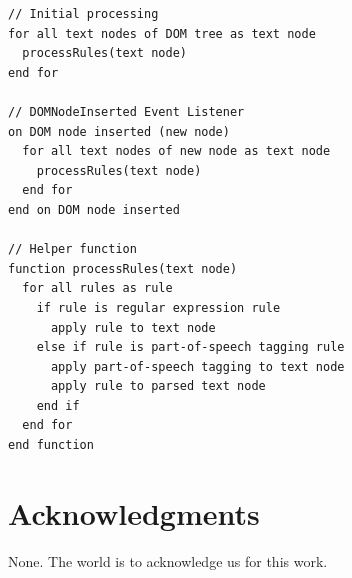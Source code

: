 \documentclass{acm_proc_article-sp}
\newcommand{\inlinelistingsize}{\fontsize{8pt}{11pt}}
\let\oldttdefault\ttdefault
\renewcommand{\ttdefault}{pcr}
\let\oldurl\url
\renewcommand{\url}[1]{\inlinelistingsize\oldurl{#1}}
\begin{document}
\begin{lstlisting}[caption=Pseudocode illustrating the browser extension's functionality., label=code:xkcd, float=h, escapechar=§, belowskip=-1em]
// Initial processing
for all text nodes of DOM tree as text node
  processRules(text node)
end for  

// DOMNodeInserted Event Listener
on DOM node inserted (new node)
  for all text nodes of new node as text node
    processRules(text node)
  end for  
end on DOM node inserted

// Helper function
function processRules(text node)
  for all rules as rule
    if rule is regular expression rule
      apply rule to text node
    else if rule is part-of-speech tagging rule
      apply part-of-speech tagging to text node
      apply rule to parsed text node
    end if
  end for
end function  
\end{lstlisting} 

\section{Acknowledgments}
None. The world is to acknowledge us for this work.

\let\ttdefault\oldttdefault
\let\url\oldurl




\balancecolumns
\end{document}
